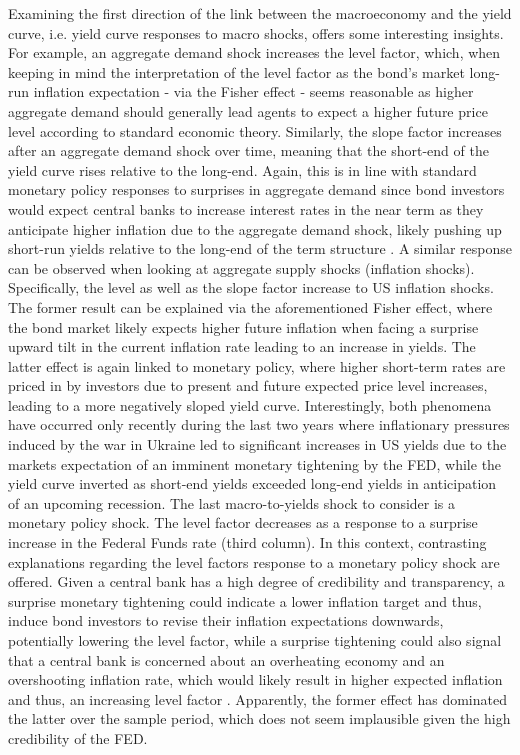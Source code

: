 Examining the first direction of the link between the macroeconomy and the yield curve, i.e. yield curve responses to macro shocks, offers some interesting insights. 
For example, an aggregate demand shock increases the level factor, which, when keeping in mind the interpretation 
of the level factor as the bond's market long-run inflation expectation - via the Fisher effect - seems reasonable as higher aggregate demand should generally lead agents to expect a higher future price level according to standard economic theory.  
Similarly, the slope factor increases after an aggregate demand shock over time, meaning that the short-end of the yield curve rises relative to the long-end. 
Again, this is in line with standard monetary policy responses to surprises in aggregate demand since bond investors would expect central banks to increase interest rates in the near term as they anticipate higher inflation due to the aggregate demand shock, likely pushing up short-run yields relative to the long-end of the term structure \citep{diebold2006macroeconomy}.
A similar response can be observed when looking at aggregate supply shocks (inflation shocks).
Specifically, the level as well as the slope factor increase to US inflation shocks.
The former result can be explained via the aforementioned Fisher effect, where the bond market likely expects higher future inflation when facing a surprise upward tilt in the current inflation rate leading to an increase in yields. 
The latter effect is again linked to monetary policy, where higher short-term rates are priced in by investors due to present and future expected price level increases, leading to a more negatively sloped yield curve. 
Interestingly, both phenomena have occurred only recently during the last two years where inflationary pressures induced by the war in Ukraine led to significant increases in US yields due to the markets expectation of an imminent monetary tightening by the FED, while the yield curve inverted as short-end yields exceeded long-end yields in anticipation of an upcoming recession. 
The last macro-to-yields shock to consider is a monetary policy shock. 
The level factor decreases as a response to a surprise increase in the Federal Funds rate (third column). 
In this context, contrasting explanations regarding the level factors response to a monetary policy shock are offered. 
Given a central bank has a high degree of credibility and transparency, a surprise monetary tightening could indicate a lower inflation target and thus, induce bond investors to revise their inflation expectations downwards, potentially lowering the level factor, while a surprise tightening could also signal that a central bank is concerned about an overheating economy and an overshooting inflation rate, which would likely result in higher expected inflation and thus, an increasing level factor \citep{diebold2006macroeconomy}. 
Apparently, the former effect has dominated the latter over the sample period, which does not seem implausible given the high credibility of the FED. 

